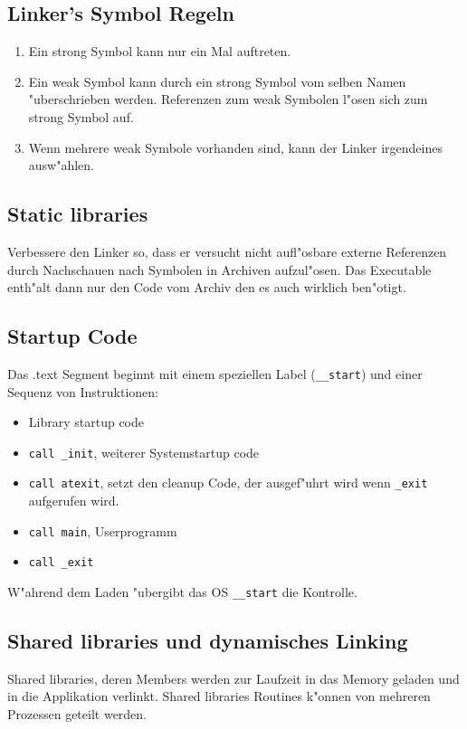 \documentclass[german, 10pt, a4paper, twocolumn]{scrartcl}
\begin{document}
\subsection{Linker's Symbol Regeln}

\begin{enumerate}
	\item Ein strong Symbol kann nur ein Mal auftreten.
	\item Ein weak Symbol kann durch ein strong Symbol vom selben Namen "uberschrieben werden. Referenzen zum weak Symbolen l"osen sich zum strong Symbol auf.
	\item Wenn mehrere weak Symbole vorhanden sind, kann der Linker irgendeines ausw"ahlen.
\end{enumerate}

\subsection{Static libraries}

Verbessere den Linker so, dass er versucht nicht aufl"osbare externe Referenzen durch Nachschauen nach Symbolen in Archiven aufzul"osen. Das Executable enth"alt dann nur den Code vom Archiv den es auch wirklich ben"otigt.

\subsection{Startup Code}

Das .text Segment beginnt mit einem speziellen Label (\verb#__start#) und einer Sequenz von Instruktionen:
\begin{itemize}
	\item Library startup code
	\item \verb#call _init#, weiterer Systemstartup code
	\item \verb#call atexit#, setzt den cleanup Code, der ausgef"uhrt wird wenn \verb#_exit# aufgerufen wird.
	\item \verb#call main#, Userprogramm
	\item \verb#call _exit#
\end{itemize}

W"ahrend dem Laden "ubergibt das OS \verb#__start# die Kontrolle.

\subsection{Shared libraries und dynamisches Linking}

Shared libraries, deren Members werden zur Laufzeit in das Memory geladen und in die Applikation verlinkt. Shared libraries Routines k"onnen von mehreren Prozessen geteilt werden.
\end{document}
